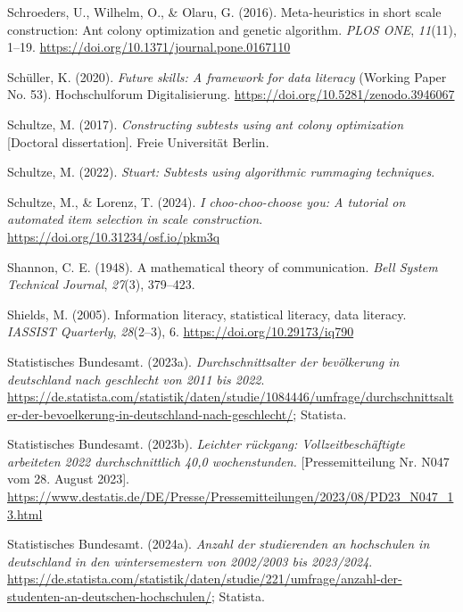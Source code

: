 \documentclass[
  12pt,
  a4paper,
  twoside]{article}
\newlength{\cslhangindent}
\newenvironment{CSLReferences}[2] %
 {\begin{list}{}{%
  \setlength{\itemindent}{0pt}
  \setlength{\leftmargin}{0pt}
  \setlength{\parsep}{0pt}
  \ifodd #1
   \setlength{\leftmargin}{\cslhangindent}
   \setlength{\itemindent}{-1\cslhangindent}
  \fi
  \setlength{\itemsep}{#2\baselineskip}}}
 {\end{list}}
\begin{document}
\begin{CSLReferences}{1}{0}
Schroeders, U., Wilhelm, O., \& Olaru, G. (2016). Meta-heuristics in short scale construction: Ant colony optimization and genetic algorithm. \emph{PLOS ONE}, \emph{11}(11), 1--19. \url{https://doi.org/10.1371/journal.pone.0167110}

Schüller, K. (2020). \emph{Future skills: A framework for data literacy} (Working Paper No. 53). Hochschulforum Digitalisierung. \url{https://doi.org/10.5281/zenodo.3946067}

Schultze, M. (2017). \emph{Constructing subtests using ant colony optimization} {[}Doctoral dissertation{]}. Freie Universität Berlin.

Schultze, M. (2022). \emph{Stuart: Subtests using algorithmic rummaging techniques}.

Schultze, M., \& Lorenz, T. (2024). \emph{I choo-choo-choose you: A tutorial on automated item selection in scale construction}. \url{https://doi.org/10.31234/osf.io/pkm3q}

Shannon, C. E. (1948). A mathematical theory of communication. \emph{Bell System Technical Journal}, \emph{27}(3), 379--423.

Shields, M. (2005). Information literacy, statistical literacy, data literacy. \emph{IASSIST Quarterly}, \emph{28}(2--3), 6. \url{https://doi.org/10.29173/iq790}

Statistisches Bundesamt. (2023a). \emph{Durchschnittsalter der bevölkerung in deutschland nach geschlecht von 2011 bis 2022}. \url{https://de.statista.com/statistik/daten/studie/1084446/umfrage/durchschnittsalter-der-bevoelkerung-in-deutschland-nach-geschlecht/}; Statista.

Statistisches Bundesamt. (2023b). \emph{Leichter rückgang: Vollzeitbeschäftigte arbeiteten 2022 durchschnittlich 40,0 wochenstunden.} {[}Pressemitteilung Nr. N047 vom 28. August 2023{]}. \url{https://www.destatis.de/DE/Presse/Pressemitteilungen/2023/08/PD23_N047_13.html}

Statistisches Bundesamt. (2024a). \emph{Anzahl der studierenden an hochschulen in deutschland in den wintersemestern von 2002/2003 bis 2023/2024}. \url{https://de.statista.com/statistik/daten/studie/221/umfrage/anzahl-der-studenten-an-deutschen-hochschulen/}; Statista.


\end{CSLReferences}
\end{document}

